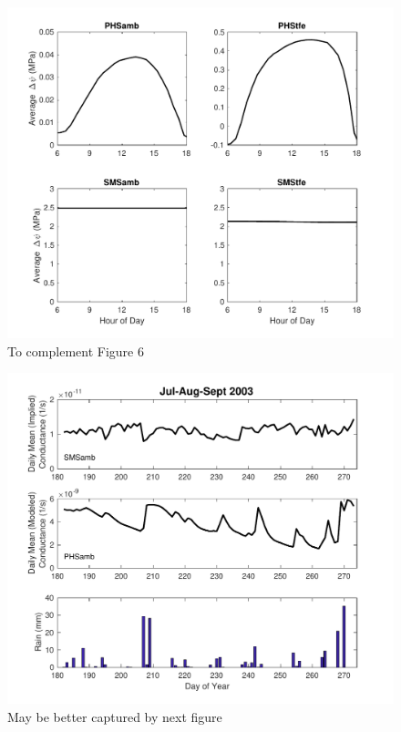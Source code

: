 \documentclass[draft,linenumbers]{agujournal}
\begin{document}
        \begin{figure}[h]
     \centering
     \includegraphics[width=30pc]{../figs3/supppsi.pdf}
     \caption{To complement Figure 6}
     \label{supp:cond}
  \end{figure}
  \clearpage
  
        \begin{figure}[h]
     \centering
     \includegraphics[width=30pc]{../figs3/suppcond.pdf}
     \caption{May be better captured by next figure}
     \label{supp:cond}
  \end{figure}
  \clearpage
  
\end{document}
